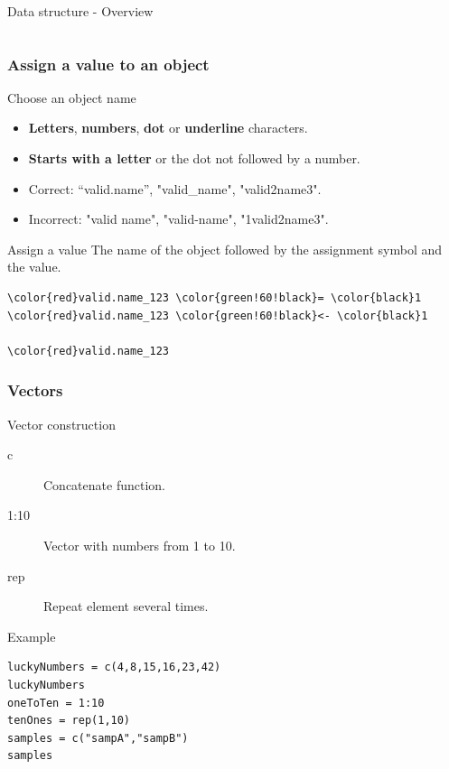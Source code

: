 \documentclass[10pt]{beamer}
\newenvironment{xframe}[2][]
  {\begin{frame}[fragile,environment=xframe,#1]
  \frametitle{#2}}
  {\end{frame}}
\begin{document}
\begin{frame}{Data structure - Overview}
\begin{columns}
\begin{column}{.2\textwidth}
    \end{column}
  \end{columns}
\end{frame}


\begin{xframe}{Assign a value to an object}
  \begin{block}{Choose an object name}
    \begin{itemize}
    \item {\bf Letters}, {\bf numbers}, {\bf dot} or {\bf underline} characters.
    \item {\bf Starts with a letter} or the dot not followed by a number.
    \item Correct: ``{\sf valid.name}'', "{\sf valid\_name}", "{\sf valid2name3}".
    \item Incorrect: "{\sf valid name}", "{\sf valid-name}", "{\sf 1valid2name3}".
    \end{itemize}
  \end{block}
  \begin{block}{Assign a value}
    The name of the object followed by the assignment symbol and the value.
    \medskip
\begin{Verbatim}[commandchars=\\\{\}]
\color{red}valid.name_123 \color{green!60!black}= \color{black}1
\color{red}valid.name_123 \color{green!60!black}<- \color{black}1

\color{red}valid.name_123
\end{Verbatim}
  \end{block}
\end{xframe}

\begin{xframe}{Vectors}
  \begin{block}{Vector construction}
    \begin{description}
    \item[c] Concatenate function.
    \item[1:10] Vector with numbers from 1 to 10.
    \item[rep] Repeat element several times.
    \end{description}
  \end{block}
  \begin{exampleblock}{Example}
\begin{verbatim}
luckyNumbers = c(4,8,15,16,23,42) 
luckyNumbers
oneToTen = 1:10
tenOnes = rep(1,10)
samples = c("sampA","sampB")
samples
\end{verbatim}
  \end{exampleblock}
\end{xframe}
\end{document}
